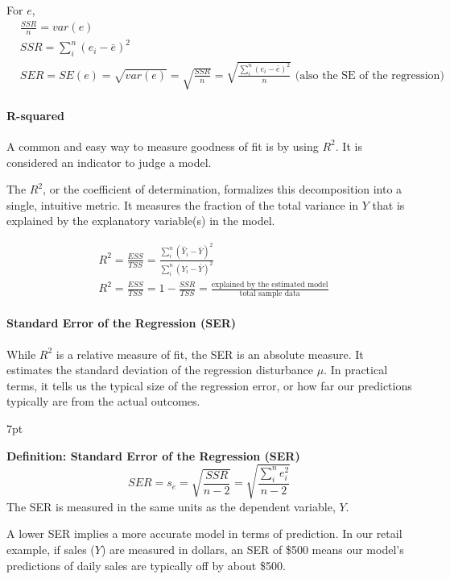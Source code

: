 \documentclass{article}
\newenvironment{greenblock}{%
\def\FrameCommand{%
  \hspace{1pt}%
    {\color{Green}%
    \vrule width 2pt}%
    {\color{greenshade}%
    \vrule width 4pt}%
  \colorbox{greenshade}%
}%
\MakeFramed{%
  \advance%
  \hsize-%
  \width%
  \FrameRestore}%
\noindent\hspace{-4.55pt}%
\begin{adjustwidth}{}{7pt}%
\vspace{2pt}\vspace{2pt}%
}
{%
\vspace{2pt}\end{adjustwidth}\endMakeFramed%
}
\begin{document}
For $e$,
\begin{align}
&\frac{SSR}{n}=var(e)
\\&SSR=\sum\limits_i^n (e_i-\bar e)^2
\\&SER=SE(e)=\sqrt{var(e)}=\sqrt{\frac{SSR}{n}}=\sqrt{\frac{\sum\limits_i^n (e_i-\bar e)^2}{n}} \text{ (also the SE of the regression)}
\end{align}

\paragraph{R-squared}

A common and easy way to measure goodness of fit is by using $R^2$. It is considered an indicator to judge a model.

The $R^2$, or the coefficient of determination, formalizes this decomposition into a single, intuitive metric. It measures the fraction of the total variance in $Y$ that is explained by the explanatory variable(s) in the model.

\begin{align}
& R^2=\frac{ESS}{TSS}=\frac{\sum\limits_i^n (\hat Y_i-\bar Y)^2}{\sum\limits_i^n (Y_i-\bar Y)^2}
\\&R^2=\frac{ESS}{TSS}=1-\frac{SSR}{TSS}=\frac{\text{explained by the estimated model}}{\text{total sample data}}
\end{align}



\paragraph{Standard Error of the Regression (SER)}
While $R^2$ is a relative measure of fit, the SER is an absolute measure. It estimates the standard deviation of the regression disturbance $\mu$. In practical terms, it tells us the typical size of the regression error, or how far our predictions typically are from the actual outcomes.

\begin{greenblock}
\textbf{Definition: Standard Error of the Regression (SER)}
\begin{equation}
SER = s_e = \sqrt{\frac{SSR}{n-2}} = \sqrt{\frac{\sum\limits_i^n e_i^2}{n-2}}
\end{equation}
The SER is measured in the same units as the dependent variable, $Y$.
\end{greenblock}

A lower SER implies a more accurate model in terms of prediction. In our retail example, if sales ($Y$) are measured in dollars, an SER of \$500 means our model's predictions of daily sales are typically off by about \$500.
\end{document}
